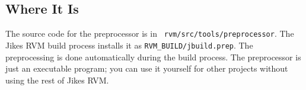 \subsection{Where It Is}

The source code for the preprocessor is in {\tt
rvm/src/tools/preprocessor}.  The Jikes RVM build process installs it
as {\tt RVM\_BUILD/jbuild.prep}.  The preprocessing is done automatically
during the build process.  The preprocessor is just an executable
program; you can use it yourself for other projects without using the
rest of Jikes RVM.


